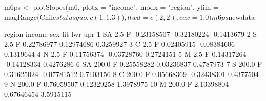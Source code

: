 \begin{Schunk}
\begin{Sinput}
 m6ps <- plotSlopes(m6, plotx = "income", modx = "region", ylim = magRange(Chile$statusquo, c(1, 1.3)), llwd = c(2, 2), cex = 1.0)
 m6ps$newdata
\end{Sinput}
\begin{Soutput}
   region income sex         fit         lwr        upr
1      SA    2.5   F -0.23158507 -0.32180224 -0.1413679
2       S    2.5   F  0.22786977  0.12974686  0.3259927
3       C    2.5   F  0.02405915 -0.08384606  0.1319644
4       N    2.5   F  0.11756374 -0.03728760  0.2724151
5       M    2.5   F  0.14317264 -0.14128334  0.4276286
6      SA  200.0   F  0.25558282  0.03236837  0.4787973
7       S  200.0   F  0.31625024 -0.07781512  0.7103156
8       C  200.0   F  0.05668369 -0.32438301  0.4377504
9       N  200.0   F  0.76059507  0.12329258  1.3978975
10      M  200.0   F  2.13398804  0.67646454  3.5915115
\end{Soutput}
\end{Schunk}
